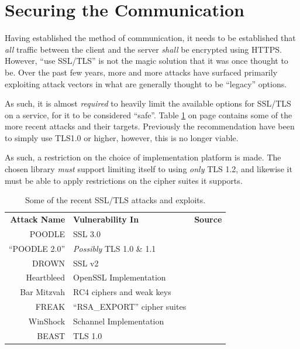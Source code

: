 	\section{Securing the Communication}
		\label{sec:design:secure-comms}
		Having established the method of communication, it needs to be established that \emph{all} traffic between the client and the server \emph{shall} be encrypted using HTTPS. However, ``use SSL/TLS'' is not the magic solution that it was once thought to be. Over the past few years, more and more attacks have surfaced primarily exploiting attack vectors in what are generally thought to be ``legacy'' options.

		As such, it is almost \emph{required} to heavily limit the available options for SSL/TLS on a service, for it to be considered ``safe''. Table \ref{table:ssl/tls} on page \pageref{table:ssl/tls} contains some of the more recent attacks and their targets. Previously the recommendation have been to simply use TLS1.0 or higher\cite{ms_tls1.0+}, however, this is no longer viable. 

		As such, a restriction on the choice of implementation platform is made. The chosen library \emph{must} support limiting itself to using \emph{only} TLS 1.2, and likewise it must be able to apply restrictions on the cipher suites it supports.

		\begin{table}
			\begin{tabular}{r | l | l}
				\textbf{Attack Name}	& \textbf{Vulnerability In}			& \textbf{Source} 						\\
				POODLE  				& SSL 3.0							& \cite{moller2014poodle}				\\
				``POODLE 2.0'' 			& \emph{Possibly} TLS 1.0 \& 1.1 	& \cite{poodlev2,poodlev2_2}			\\
				DROWN 					& SSL v2  							& \cite{aviramdrown}					\\
				Heartbleed 				& OpenSSL Implementation			& \cite{durumeric2014matter}			\\
				Bar Mitzvah 			& RC4 ciphers and weak keys 		& \cite{mantin2015barmitzvah}			\\
				FREAK 					& ``RSA\_EXPORT'' cipher suites 	& \cite[p.3]{novotnyimplementation}		\\
				WinShock 				& Schannel Implementation 			& \cite[p.2]{novotnyimplementation} 	\\
				BEAST 					& TLS 1.0 							& \cite{beast} 								\\
			\end{tabular}
			\caption{Some of the recent SSL/TLS attacks and exploits.}
			\label{table:ssl/tls}
		\end{table}


